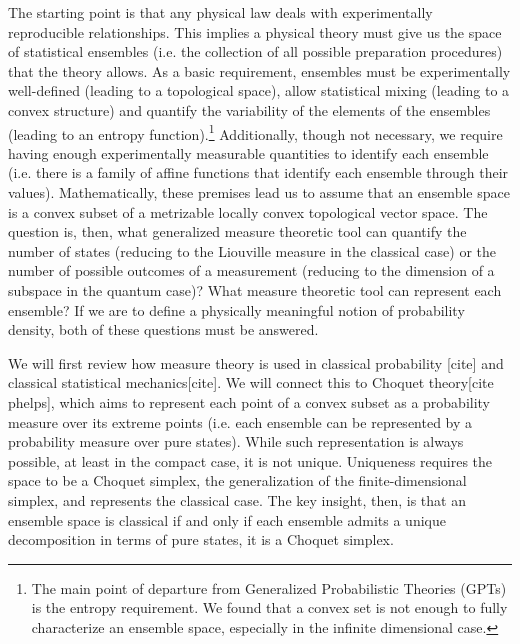 \documentclass[10pt,twocolumn, nofootinbib]{revtex4-2}
\begin{document}
The starting point is that any physical law deals with experimentally reproducible relationships. This implies a physical theory must give us the space of statistical ensembles (i.e. the collection of all possible preparation procedures) that the theory allows. As a basic requirement, ensembles must be experimentally well-defined (leading to a topological space), allow statistical mixing (leading to a convex structure) and quantify the variability of the elements of the ensembles (leading to an entropy function).\footnote{The main point of departure from Generalized Probabilistic Theories (GPTs) is the entropy requirement. We found that a convex set is not enough to fully characterize an ensemble space, especially in the infinite dimensional case.} Additionally, though not necessary, we require having enough experimentally measurable quantities to identify each ensemble (i.e. there is a family of affine functions that identify each ensemble through their values). Mathematically, these premises lead us to assume that an ensemble space is a convex subset of a metrizable locally convex topological vector space. The question is, then, what generalized measure theoretic tool can quantify the number of states (reducing to the Liouville measure in the classical case) or the number of possible outcomes of a measurement (reducing to the dimension of a subspace in the quantum case)? What measure theoretic tool can represent each ensemble? If we are to define a physically meaningful notion of probability density, both of these questions must be answered.

We will first review how measure theory is used in classical probability [cite] and classical statistical mechanics[cite]. We will connect this to Choquet theory[cite phelps], which aims to represent each point of a convex subset as a probability measure over its extreme points (i.e. each ensemble can be represented by a probability measure over pure states). While such representation is always possible, at least in the compact case, it is not unique. Uniqueness requires the space to be a Choquet simplex, the generalization of the finite-dimensional simplex, and represents the classical case. The key insight, then, is that an ensemble space is classical if and only if each ensemble admits a unique decomposition in terms of pure states, it is a Choquet simplex.
\end{document}
